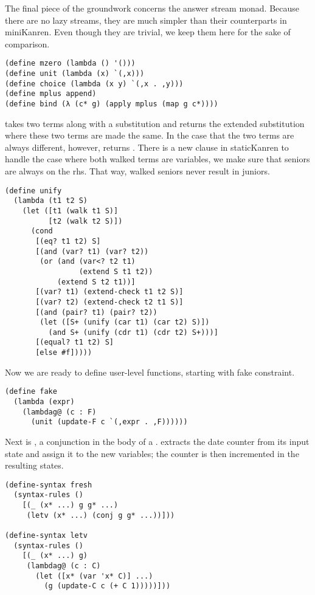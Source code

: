 The final piece of the groundwork concerns the answer stream monad. Because there are no lazy streams, they are much simpler than their counterparts in miniKanren. Even though they are trivial, we keep them here for the sake of comparison.
\begin{lstlisting}
(define mzero (lambda () '()))
(define unit (lambda (x) `(,x)))
(define choice (lambda (x y) `(,x . ,y)))
(define mplus append)
(define bind (λ (c* g) (apply mplus (map g c*))))
\end{lstlisting}

 takes two terms along with a substitution and returns the extended substitution where these two terms are made the same. In the case that the two terms are always different, however,  returns . There is a new clause in staticKanren to handle the case where both walked terms are variables, we make sure that seniors are always on the rhs. That way, walked seniors never result in juniors.
\begin{lstlisting}
(define unify
  (lambda (t1 t2 S)
    (let ([t1 (walk t1 S)]
          [t2 (walk t2 S)])
      (cond
       [(eq? t1 t2) S]
       [(and (var? t1) (var? t2))
        (or (and (var<? t2 t1)
                 (extend S t1 t2))
            (extend S t2 t1))]
       [(var? t1) (extend-check t1 t2 S)]
       [(var? t2) (extend-check t2 t1 S)]
       [(and (pair? t1) (pair? t2))
        (let ([S+ (unify (car t1) (car t2) S)])
          (and S+ (unify (cdr t1) (cdr t2) S+)))]
       [(equal? t1 t2) S]
       [else #f]))))
\end{lstlisting}

Now we are ready to define user-level functions, starting with fake constraint.
\begin{lstlisting}
(define fake
  (lambda (expr)
    (lambdag@ (c : F)
      (unit (update-F c `(,expr . ,F))))))
\end{lstlisting}

Next is , a conjunction in the body of a .  extracts the date counter from its input state and assign it to the new variables; the counter is then incremented in the resulting states.
\begin{lstlisting}
(define-syntax fresh
  (syntax-rules ()
    [(_ (x* ...) g g* ...)
     (letv (x* ...) (conj g g* ...))]))

(define-syntax letv
  (syntax-rules ()
    [(_ (x* ...) g)
     (lambdag@ (c : C)
       (let ([x* (var 'x* C)] ...)
         (g (update-C c (+ C 1)))))]))
\end{lstlisting}

